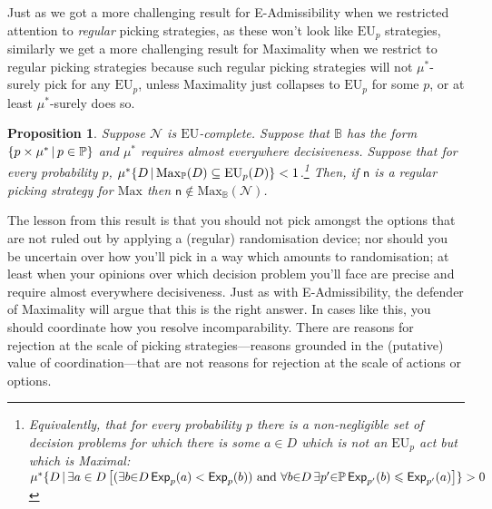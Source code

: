 \documentclass[a4paper]{article}
\newtheorem{proposition}[theorem]{Proposition}
\renewcommand\P{\mathbb{P}} %
\newcommand\Exp{\mathsf{Exp}}
\newcommand\EU{\mathrm{EU}}
\newcommand\Maximality{\mathrm{Max}}
\newcommand{\n}{\mathsf{n}}
\newcommand\Nu{\mathcal{N}}
\newcommand{\IB}{\mathbb{B}}
\newcommand{\IP}{\P}
\renewcommand{\color}[1]{}
\newenvironment{colored}[1]{\leavevmode\color{#1}}{}
\newcommand\SetDelimiter[1][]{
	\nonscript\,#1\vert \allowbreak \nonscript\,\mathopen{}}
\providecommand\given{\SetDelimiter}
\renewcommand{\leq}{\leqslant}
\newenvironment{CCM rewritten}
{\begingroup\color{blue}} %
{\endgroup}              %
\begin{document}
	

Just as we got a more challenging result for E-Admissibility when we restricted attention to \emph{regular} picking strategies, as these won't look like $\EU_p$ strategies, similarly we get a more challenging result for Maximality when we restrict to regular picking strategies because such regular picking strategies will not $\mu^*$-surely pick for any $\EU_p$, unless Maximality just collapses to $\EU_p$ for some $p$, or at least $\mu^*$-surely does so.


\begin{proposition}\label{thm:max-nu-reg-nec}
	Suppose $\Nu$ is $\EU$-complete. 
	Suppose that $\IB$ has the form $\{p\times \mu^*\given p\in \IP\}$ and $\mu^*$ requires almost everywhere decisiveness. Suppose that for every probability $p$, $\mu^*\{D\given \Maximality_\IP(D)\subseteq\EU_p(D)\}< 1$.\footnote{Equivalently, that for every probability $p$ there is a non-negligible set of decision problems for which there is some $a\in D$ which is not an $\EU_p$ act but which is Maximal: $\mu^*\{D\given \exists a\in D\left[(\exists b{\in} D \, \Exp_{p}(a)<\Exp_{p}(b))\text{ and }\forall b{\in} D\, \exists p'{\in}\IP \,\Exp_{p'}(b)\leq \Exp_{p'}(a)\right]\}>0$} %
	Then, if $\n$ is a regular picking strategy for $\Maximality$ then $\n\notin \Maximality_\IB(\Nu)$.
\end{proposition}


	The lesson from this result is that you should not pick amongst the options that are not ruled out by applying a (regular) randomisation device; nor should you be uncertain over how you'll pick in a way which amounts to randomisation; at least when your opinions over which decision problem you'll face are precise and require almost everywhere decisiveness. 
	Just as with E-Admissibility, the defender of Maximality will argue that this is the right answer. In cases like this, you should coordinate how you resolve incomparability. There are reasons for rejection at the scale of picking strategies---reasons grounded in the (putative) value of coordination---that are not reasons for rejection at the scale of actions or options. 
	
\end{document}
